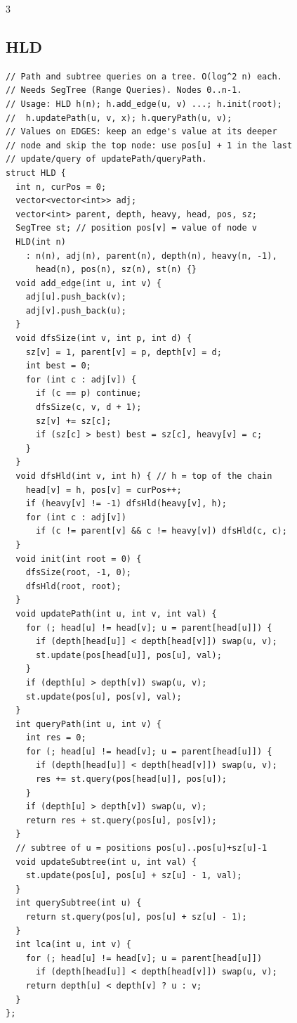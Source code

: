 \documentclass[8pt, a4paper]{article}
\begin{document}
\begin{multicols*}{3}
\subsection{HLD}
\begin{lstlisting}
// Path and subtree queries on a tree. O(log^2 n) each.
// Needs SegTree (Range Queries). Nodes 0..n-1.
// Usage: HLD h(n); h.add_edge(u, v) ...; h.init(root);
//  h.updatePath(u, v, x); h.queryPath(u, v);
// Values on EDGES: keep an edge's value at its deeper
// node and skip the top node: use pos[u] + 1 in the last
// update/query of updatePath/queryPath.
struct HLD {
  int n, curPos = 0;
  vector<vector<int>> adj;
  vector<int> parent, depth, heavy, head, pos, sz;
  SegTree st; // position pos[v] = value of node v
  HLD(int n)
    : n(n), adj(n), parent(n), depth(n), heavy(n, -1),
      head(n), pos(n), sz(n), st(n) {}
  void add_edge(int u, int v) {
    adj[u].push_back(v);
    adj[v].push_back(u);
  }
  void dfsSize(int v, int p, int d) {
    sz[v] = 1, parent[v] = p, depth[v] = d;
    int best = 0;
    for (int c : adj[v]) {
      if (c == p) continue;
      dfsSize(c, v, d + 1);
      sz[v] += sz[c];
      if (sz[c] > best) best = sz[c], heavy[v] = c;
    }
  }
  void dfsHld(int v, int h) { // h = top of the chain
    head[v] = h, pos[v] = curPos++;
    if (heavy[v] != -1) dfsHld(heavy[v], h);
    for (int c : adj[v])
      if (c != parent[v] && c != heavy[v]) dfsHld(c, c);
  }
  void init(int root = 0) {
    dfsSize(root, -1, 0);
    dfsHld(root, root);
  }
  void updatePath(int u, int v, int val) {
    for (; head[u] != head[v]; u = parent[head[u]]) {
      if (depth[head[u]] < depth[head[v]]) swap(u, v);
      st.update(pos[head[u]], pos[u], val);
    }
    if (depth[u] > depth[v]) swap(u, v);
    st.update(pos[u], pos[v], val);
  }
  int queryPath(int u, int v) {
    int res = 0;
    for (; head[u] != head[v]; u = parent[head[u]]) {
      if (depth[head[u]] < depth[head[v]]) swap(u, v);
      res += st.query(pos[head[u]], pos[u]);
    }
    if (depth[u] > depth[v]) swap(u, v);
    return res + st.query(pos[u], pos[v]);
  }
  // subtree of u = positions pos[u]..pos[u]+sz[u]-1
  void updateSubtree(int u, int val) {
    st.update(pos[u], pos[u] + sz[u] - 1, val);
  }
  int querySubtree(int u) {
    return st.query(pos[u], pos[u] + sz[u] - 1);
  }
  int lca(int u, int v) {
    for (; head[u] != head[v]; u = parent[head[u]])
      if (depth[head[u]] < depth[head[v]]) swap(u, v);
    return depth[u] < depth[v] ? u : v;
  }
};
\end{lstlisting}

\end{multicols*}
\end{document}

